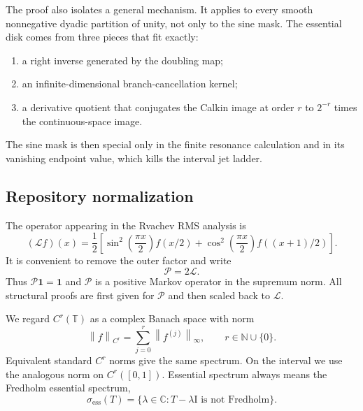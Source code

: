 \documentclass[11pt,a4paper]{article}
\theoremstyle{definition}
\theoremstyle{remark}
\newcommand{\C}{\mathbb C}
\newcommand{\N}{\mathbb N}
\newcommand{\T}{\mathbb T}
\newcommand{\spece}{\sigma_{\mathrm{ess}}}
\newcommand{\norm}[1]{\left\lVert #1\right\rVert}
\newcommand{\Lop}{\mathcal L}
\newcommand{\Pop}{\mathcal P}
\newcommand{\id}{\mathrm I}
\newcommand{\one}{\mathbf 1}
\begin{document}
The proof also isolates a general mechanism.  It applies to every smooth
nonnegative dyadic partition of unity, not only to the sine mask.  The
essential disk comes from three pieces that fit exactly:
\begin{enumerate}
\item a right inverse generated by the doubling map;
\item an infinite-dimensional branch-cancellation kernel;
\item a derivative quotient that conjugates the Calkin image at order $r$
      to $2^{-r}$ times the continuous-space image.
\end{enumerate}
The sine mask is then special only in the finite resonance calculation and in
its vanishing endpoint value, which kills the interval jet ladder.

\subsection{Repository normalization}
The operator appearing in the Rvachev RMS analysis is
\begin{equation}
 (\Lop f)(x)=\frac12\left[
 \sin^2\!\left(\frac{\pi x}{2}\right)f(x/2)
 +\cos^2\!\left(\frac{\pi x}{2}\right)f((x+1)/2)
 \right].
 \label{eq:L-definition}
\end{equation}
It is convenient to remove the outer factor and write
\begin{equation}
 \Pop=2\Lop.
 \label{eq:P=2L}
\end{equation}
Thus $\Pop\one=\one$ and $\Pop$ is a positive Markov operator in the
supremum norm.  All structural proofs are first given for $\Pop$ and then
scaled back to $\Lop$.

We regard $C^r(\T)$ as a complex Banach space with norm
\begin{equation}
 \norm f_{C^r}=\sum_{j=0}^{r}\norm{f^{(j)}}_\infty,
 \qquad r\in\N\cup\{0\}.
 \label{eq:Cr-norm}
\end{equation}
Equivalent standard $C^r$ norms give the same spectrum.  On the interval we
use the analogous norm on $C^r([0,1])$.  Essential spectrum always means the
Fredholm essential spectrum,
\begin{equation}
 \spece(T)=\{\lambda\in\C:T-\lambda\id\text{ is not Fredholm}\}.
 \label{eq:fredholm-essential}
\end{equation}
\end{document}
